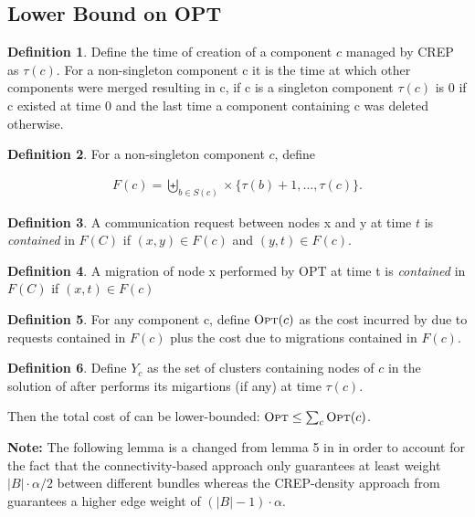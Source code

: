 \documentclass[xcolor=dvipsnames, tikz, 11pt]{article}
\newcommand{\nl}{\newline}
\newcommand{\crep}{C{\scriptsize REP}}
\newcommand{\opt}{\text{O{\scriptsize PT}}}
\theoremstyle{definition}
\newtheorem{defi}{Definition}
\begin{document}
	\subsection{Lower Bound on OPT}
	\begin{defi}
		Define the time of creation of a component $c$ managed by \crep{} as $\tau(c)$. For a non-singleton component c it is the time at which other components were merged resulting in c, if c is a singleton component $\tau(c)$ is 0 if c existed at time 0 and the last time a component containing c was deleted otherwise.
	\end{defi}
	\begin{defi}
		For a non-singleton component $c$, define
	\end{defi}
	\begin{align*}
	F(c)=\biguplus_{b\in S(c)}\times \{\tau(b)+1,...,\tau(c)\}.
	\end{align*}
	
	\begin{defi}
		A communication request between nodes x and y at time $t$ is \textit{contained} in $F(C)$ if $(x,y)\in F(c)$ and $(y,t)\in F(c)$.
	\end{defi}

	\begin{defi}
		A migration of node x performed by OPT at time t is \textit{contained} in $F(C)$ if $(x,t)\in F(c)$
	\end{defi}

	\begin{defi}
		For any component c, define $\opt{}(c)$ as the cost incurred by \opt{} due to requests contained in $F(c)$ plus the cost due to migrations contained in $F(c)$.
	\end{defi}

	\begin{defi}
		Define $Y_c$ as the set of clusters containing nodes of $c$ in the solution of \opt after \opt performs its migartions (if any) at time $\tau(c)$.
	\end{defi}
	Then the total cost of \opt can be lower-bounded: $\opt\leq\sum_c \opt(c)$.\nl\nl	
	
	\textbf{Note:} The following lemma is a changed from lemma 5 in \cite{Avin2015} in order to account for the fact that the connectivity-based approach only guarantees at least weight $|B|\cdot\alpha/2$ between different bundles whereas the \crep{}-density approach from \cite{Avin2015} guarantees a higher edge weight of $(|B|-1)\cdot\alpha$.
\end{document}
